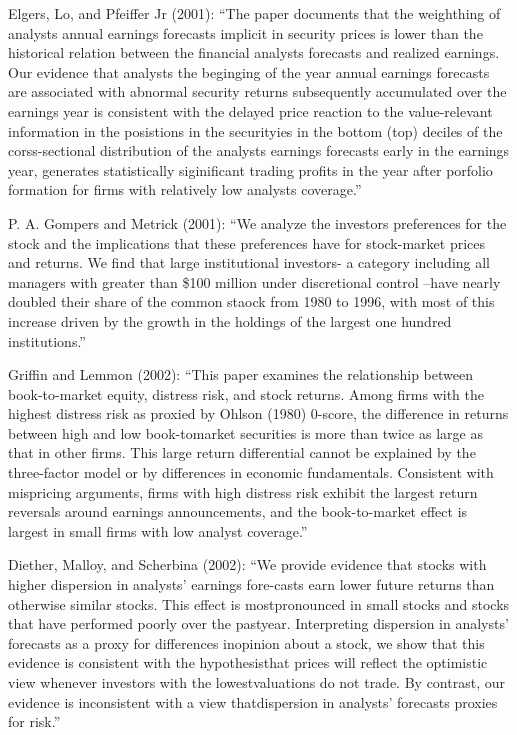 \documentclass[
  letterpaper,
  DIV=11,
  numbers=noendperiod]{scrreprt}
\begin{document}
Elgers, Lo, and Pfeiffer Jr (2001): ``The paper documents that the
weighthing of analysts annual earnings forecasts implicit in security
prices is lower than the historical relation between the financial
analysts forecasts and realized earnings. Our evidence that analysts the
beginging of the year annual earnings forecasts are associated with
abnormal security returns subsequently accumulated over the earnings
year is consistent with the delayed price reaction to the value-relevant
information in the posistions in the securityies in the bottom (top)
deciles of the corss-sectional distribution of the analysts earnings
forecasts early in the earnings year, generates statistically
siginificant trading profits in the year after porfolio formation for
firms with relatively low analysts coverage.''

P. A. Gompers and Metrick (2001): ``We analyze the investors preferences
for the stock and the implications that these preferences have for
stock-market prices and returns. We find that large institutional
investors- a category including all managers with greater than \$100
million under discretional control --have nearly doubled their share of
the common staock from 1980 to 1996, with most of this increase driven
by the growth in the holdings of the largest one hundred institutions.''

Griffin and Lemmon (2002): ``This paper examines the relationship
between book-to-market equity, distress risk, and stock returns. Among
firms with the highest distress risk as proxied by Ohlson (1980)
0-score, the difference in returns between high and low book-tomarket
securities is more than twice as large as that in other firms. This
large return differential cannot be explained by the three-factor model
or by differences in economic fundamentals. Consistent with mispricing
arguments, firms with high distress risk exhibit the largest return
reversals around earnings announcements, and the book-to-market effect
is largest in small firms with low analyst coverage.''

Diether, Malloy, and Scherbina (2002): ``We provide evidence that stocks
with higher dispersion in analysts' earnings fore-casts earn lower
future returns than otherwise similar stocks. This effect is
mostpronounced in small stocks and stocks that have performed poorly
over the pastyear. Interpreting dispersion in analysts' forecasts as a
proxy for differences inopinion about a stock, we show that this
evidence is consistent with the hypothesisthat prices will reflect the
optimistic view whenever investors with the lowestvaluations do not
trade. By contrast, our evidence is inconsistent with a view
thatdispersion in analysts' forecasts proxies for risk.''
\end{document}
